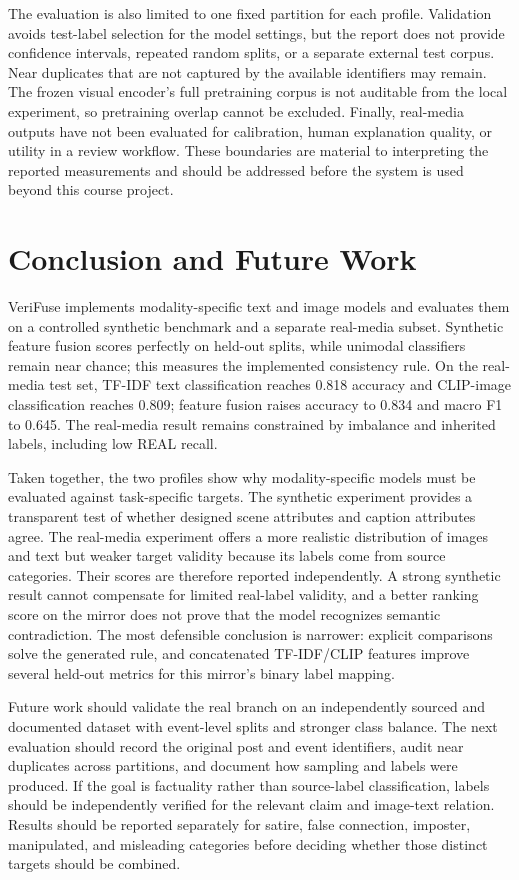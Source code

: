 \documentclass[conference]{IEEEtran}
\begin{document}
The evaluation is also limited to one fixed partition for each profile. Validation avoids test-label selection for the model settings, but the report does not provide confidence intervals, repeated random splits, or a separate external test corpus. Near duplicates that are not captured by the available identifiers may remain. The frozen visual encoder's full pretraining corpus is not auditable from the local experiment, so pretraining overlap cannot be excluded. Finally, real-media outputs have not been evaluated for calibration, human explanation quality, or utility in a review workflow. These boundaries are material to interpreting the reported measurements and should be addressed before the system is used beyond this course project.

\section{Conclusion and Future Work}
VeriFuse implements modality-specific text and image models and evaluates them on a controlled synthetic benchmark and a separate real-media subset. Synthetic feature fusion scores perfectly on held-out splits, while unimodal classifiers remain near chance; this measures the implemented consistency rule. On the real-media test set, TF-IDF text classification reaches 0.818 accuracy and CLIP-image classification reaches 0.809; feature fusion raises accuracy to 0.834 and macro F1 to 0.645. The real-media result remains constrained by imbalance and inherited labels, including low REAL recall.

Taken together, the two profiles show why modality-specific models must be evaluated against task-specific targets. The synthetic experiment provides a transparent test of whether designed scene attributes and caption attributes agree. The real-media experiment offers a more realistic distribution of images and text but weaker target validity because its labels come from source categories. Their scores are therefore reported independently. A strong synthetic result cannot compensate for limited real-label validity, and a better ranking score on the mirror does not prove that the model recognizes semantic contradiction. The most defensible conclusion is narrower: explicit comparisons solve the generated rule, and concatenated TF-IDF/CLIP features improve several held-out metrics for this mirror's binary label mapping.

Future work should validate the real branch on an independently sourced and documented dataset with event-level splits and stronger class balance. The next evaluation should record the original post and event identifiers, audit near duplicates across partitions, and document how sampling and labels were produced. If the goal is factuality rather than source-label classification, labels should be independently verified for the relevant claim and image-text relation. Results should be reported separately for satire, false connection, imposter, manipulated, and misleading categories before deciding whether those distinct targets should be combined.
\end{document}
